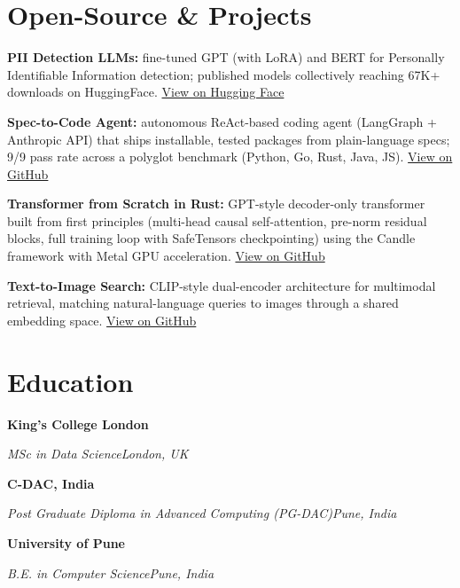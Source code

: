 \documentclass[10pt,a4paper]{article}
\newcommand{\entry}[4]{%
  {\color{company}\bfseries #1}\hfill {\color{muted}#2}\par
  \vspace{1pt}
  {\itshape #3}\hfill {\color{muted}\itshape #4}\par
  \vspace{3pt}%
}
\begin{document}
\section{Open-Source \& Projects}
\begin{tight}
  \item \textbf{PII Detection LLMs:} fine-tuned GPT (with LoRA) and BERT for Personally Identifiable Information detection; published models collectively reaching 67K+ downloads on HuggingFace. \href{https://huggingface.co/ab-ai/pii_model}{View on Hugging Face}
  \item \textbf{Spec-to-Code Agent:} autonomous ReAct-based coding agent (LangGraph + Anthropic API) that ships installable, tested packages from plain-language specs; 9/9 pass rate across a polyglot benchmark (Python, Go, Rust, Java, JS). \href{https://github.com/abhijeetscode/Spec-to-Code-Agent}{View on GitHub}
  \item \textbf{Transformer from Scratch in Rust:} GPT-style decoder-only transformer built from first principles (multi-head causal self-attention, pre-norm residual blocks, full training loop with SafeTensors checkpointing) using the Candle framework with Metal GPU acceleration. \href{https://github.com/abhijeetscode/transformer-rust}{View on GitHub}
  \item \textbf{Text-to-Image Search:} CLIP-style dual-encoder architecture for multimodal retrieval, matching natural-language queries to images through a shared embedding space. \href{https://github.com/abhijeetscode/text-to-image-search}{View on GitHub}
\end{tight}

\section{Education}
\entry{King's College London}{}{MSc in Data Science}{London, UK}
\vspace{-3pt}
\entry{C-DAC, India}{}{Post Graduate Diploma in Advanced Computing (PG-DAC)}{Pune, India}
\vspace{-3pt}
\entry{University of Pune}{}{B.E. in Computer Science}{Pune, India}
\end{document}
